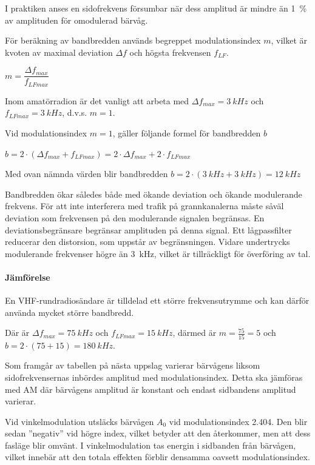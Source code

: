 I praktiken anses en sidofrekvens försumbar när dess amplitud är mindre än 1~\%
av amplituden för omodulerad bärvåg.

För beräkning av bandbredden används begreppet modulationsindex \(m\), vilket är
kvoten av maximal deviation \(\Delta f\) och högsta frekvensen \(f_{LF}\).

\(m = \dfrac{\Delta f_{max}}{f_{LFmax}}\)

Inom amatörradion är det vanligt att arbeta med \(\Delta f_{max} = 3~kHz\) och
\(f_{LFmax} = 3~kHz\), d.v.s. \(m = 1\).

Vid modulationsindex \(m = 1\), gäller följande formel för bandbredden \(b\)

\(b = 2 \cdot ( \Delta f_{max} + f_{LFmax}) = 2 \cdot \Delta f_{max}
 + 2 \cdot f_{LFmax}\)

Med ovan nämnda värden blir bandbredden \(b = 2 \cdot (3~kHz + 3~kHz) = 12~kHz\)

Bandbredden ökar således både med ökande deviation och ökande modulerande
frekvens.
För att inte interferera med trafik på grannkanalerna måste såväl deviation som
frekvensen på den modulerande signalen begränsas.
En deviationsbegränsare begränsar amplituden på denna signal.
Ett lågpassfilter reducerar den distorsion, som uppstår av begränsningen.
Vidare undertrycks modulerande frekvenser högre än 3~kHz, vilket är
tillräckligt för överföring av tal.

\paragraph{Jämförelse}

En VHF-rundradiosändare är tilldelad ett större frekvensutrymme och kan därför
använda mycket större bandbredd.

Där är \(\Delta f_{max} = 75~kHz\) och \(f_{LFmax} = 15~kHz\), därmed är
\(m = \frac{75}{15} = 5\) och \(b = 2 \cdot (75 + 15) = 180~kHz\).

Som framgår av tabellen på nästa uppslag varierar bärvågens liksom
sidofrekvensernas inbördes amplitud med modulationsindex.
Detta ska jämföras med AM där bärvågens amplitud är konstant och endast
sidbandens amplitud varierar.

Vid vinkelmodulation utsläcks bärvågen \(A_0\) vid modulationsindex 2.404.
Den blir sedan ''negativ'' vid högre index, vilket betyder att den återkommer,
men att dess fasläge blir omvänt.
I vinkelmodulation tas energin i sidbanden från bärvågen, vilket innebär att
den totala effekten förblir densamma oavsett modulationsindex.

